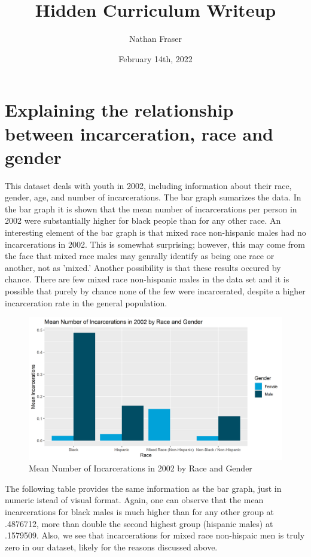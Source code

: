 \documentclass{article}
\author{Nathan Fraser}
\title{Hidden Curriculum Writeup}
\date{February 14th, 2022}
\begin{document}
\maketitle

\section{Explaining the relationship between incarceration, race and gender}

This dataset deals with youth in 2002, including information about their race, gender, age, and number of incarcerations. The bar graph sumarizes the data. In the bar graph it is shown that the mean number of incarcerations per person in 2002 were substantially higher for black people than for any other race. An interesting element of the bar graph is that mixed race non-hispanic males had no incarcerations in 2002. This is somewhat surprising; however, this may come from the face that mixed race males may genrally identify as being one race or another, not as 'mixed.' Another possibility is that these results occured by chance. There are few mixed race non-hispanic males in the data set and it is possible that purely by chance none of the few were incarcerated, despite a higher incarceration rate in the general population.


\begin{figure}[H]
    \begin{center}
        \includegraphics[width=.85\textwidth]{incarceration_by_racegender}
    \end{center}
    \caption{Mean Number of Incarcerations in 2002 by Race and Gender}
    \label{fig:graph}
\end{figure}


The following table provides the same information as the bar graph, just in numeric istead of visual format. Again, one can observe that the mean incarcerations for black males is much higher than for any other group at .4876712, more than double the second highest group (hispanic males) at .1579509. Also, we see that incarcerations for mixed race non-hispaic men is truly zero in our dataset, likely for the reasons discussed above.
\end{document}
